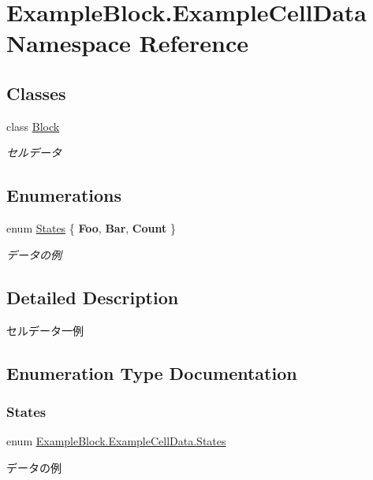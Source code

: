 \hypertarget{namespace_example_block_1_1_example_cell_data}{}\section{Example\+Block.\+Example\+Cell\+Data Namespace Reference}
\label{namespace_example_block_1_1_example_cell_data}
\subsection*{Classes}
\begin{DoxyCompactItemize}
\item 
class \mbox{\hyperlink{class_example_block_1_1_example_cell_data_1_1_block}{Block}}
\begin{DoxyCompactList}\small\item\em セルデータ \end{DoxyCompactList}\end{DoxyCompactItemize}
\subsection*{Enumerations}
\begin{DoxyCompactItemize}
\item 
enum \mbox{\hyperlink{namespace_example_block_1_1_example_cell_data_a6921c403602d917464ccf88b5ac8b2bc}{States}} \{ {\bfseries Foo}, 
{\bfseries Bar}, 
{\bfseries Count}
 \}
\begin{DoxyCompactList}\small\item\em データの例 \end{DoxyCompactList}\end{DoxyCompactItemize}


\subsection{Detailed Description}
セルデータ一例 

\subsection{Enumeration Type Documentation}
\mbox{\label{namespace_example_block_1_1_example_cell_data_a6921c403602d917464ccf88b5ac8b2bc}} 
\subsubsection{\texorpdfstring{States}{States}}
{\footnotesize\ttfamily enum \mbox{\hyperlink{namespace_example_block_1_1_example_cell_data_a6921c403602d917464ccf88b5ac8b2bc}{Example\+Block.\+Example\+Cell\+Data.\+States}}\hspace{0.3cm}{\ttfamily [strong]}}



データの例 

